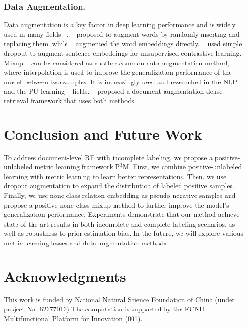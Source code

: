 \documentclass[letterpaper]{article} %
\begin{document}
\subsubsection{Data Augmentation.}
Data augmentation is a key factor in deep learning performance and is widely used in many fields ~\cite{DBLP:journals/jbd/ShortenK19,DBLP:conf/naacl/HedderichLASK21}. ~\cite{DBLP:conf/emnlp/WeiZ19,ma2019nlpaug} proposed to augment words by randomly inserting and replacing them, while ~\cite{DBLP:conf/acl/LeeKLH20} augmented the word embeddings directly. ~\cite{DBLP:conf/emnlp/GaoYC21} used simple dropout to augment sentence embeddings for unsupervised contrastive learning. Mixup ~\cite{DBLP:conf/iclr/ZhangCDL18,DBLP:conf/icml/VermaLBNMLB19} can be considered as another common data augmentation method, where interpolation is used to improve the generalization performance of the model between two samples. It is increasingly used and researched in the NLP ~\cite{DBLP:conf/acl/ChenYY20,DBLP:conf/acl/YinWQX21,DBLP:conf/naacl/WuX0ZMXZ22} and the PU learning ~\cite{DBLP:conf/nips/ChenLWZW20,DBLP:journals/corr/abs-2004-09388,DBLP:conf/iclr/LiLFO22,DBLP:conf/cvpr/ZhaoXJWH22} fields. ~\cite{DBLP:conf/acl/JeongBCHP22} proposed a document augmentation dense retrieval framework that uses both methods.

\section{Conclusion and Future Work}

To address document-level RE with incomplete labeling, we propose a positive-unlabeled metric learning framework P$^{3}$M. First, we combine positive-unlabeled learning with metric learning to learn better representations. Then, we use dropout augmentation to expand the distribution of labeled positive samples. Finally, we use none-class relation embedding as pseudo-negative samples and propose a positive-none-class mixup method to further improve the model's generalization performance. Experiments demonstrate that our method achieve state-of-the-art results in both incomplete and complete labeling scenarios, as well as robustness to prior estimation bias. In the future, we will explore various metric learning losses and data augmentation methods.

\section{Acknowledgments}

This work is funded by National Natural Science Foundation of China (under project No. 62377013).The computation is supported by the ECNU Multifunctional Platform for Innovation (001).


\end{document}
